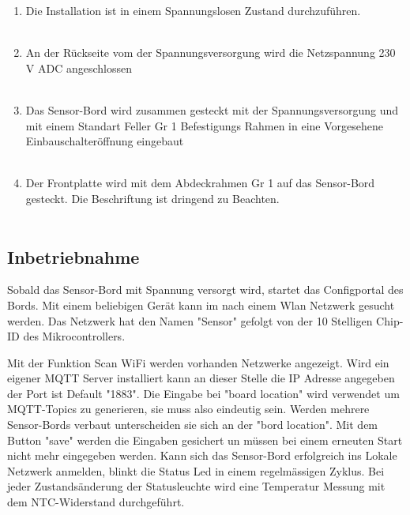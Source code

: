 \begin{enumerate}
	\item Die Installation ist in einem Spannungslosen Zustand durchzuführen.\\
	\\
	\item An der Rückseite vom der Spannungsversorgung wird die Netzspannung 230 V ADC angeschlossen\\
	\\
	\item Das Sensor-Bord wird zusammen gesteckt mit der Spannungsversorgung und mit einem Standart Feller Gr 1 Befestigungs Rahmen in eine Vorgesehene Einbauschalteröffnung eingebaut \\
	\\
	\item Der Frontplatte wird mit dem Abdeckrahmen Gr 1 auf das Sensor-Bord gesteckt. Die Beschriftung ist dringend zu Beachten.\\
	\\
	\end{enumerate}

\subsection{Inbetriebnahme}
Sobald das Sensor-Bord mit Spannung versorgt wird, startet das Configportal des Bords. Mit einem beliebigen Gerät kann im nach einem Wlan Netzwerk gesucht werden. Das Netzwerk hat den Namen "Sensor" gefolgt von der 10 Stelligen Chip-ID des Mikrocontrollers. 

Mit der Funktion Scan WiFi werden vorhanden Netzwerke angezeigt. Wird ein eigener MQTT Server installiert kann an dieser Stelle die IP Adresse angegeben der Port ist Default "1883". Die Eingabe bei "board location" wird verwendet um MQTT-Topics zu generieren, sie muss also eindeutig sein. Werden mehrere Sensor-Bords verbaut unterscheiden sie sich an der "bord location". Mit dem Button "save" werden die Eingaben gesichert un müssen bei einem erneuten Start nicht mehr eingegeben werden. Kann sich das Sensor-Bord erfolgreich ins Lokale Netzwerk anmelden, blinkt die Status Led in einem regelmässigen Zyklus. Bei jeder Zustandsänderung der Statusleuchte wird eine Temperatur Messung mit dem NTC-Widerstand durchgeführt. 

